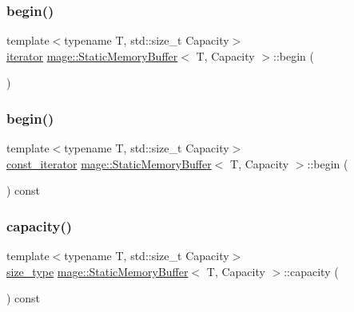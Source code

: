 \subsubsection{\texorpdfstring{begin()}{begin()}\hspace{0.1cm}{\footnotesize\ttfamily [1/2]}}
{\footnotesize\ttfamily template$<$typename T, std\+::size\+\_\+t Capacity$>$ \\
\mbox{\hyperlink{classmage_1_1_static_memory_buffer_abeee1c933cd54117e1a92de4a1cc698f}{iterator}} \mbox{\hyperlink{classmage_1_1_static_memory_buffer}{mage\+::\+Static\+Memory\+Buffer}}$<$ T, Capacity $>$\+::begin (\begin{DoxyParamCaption}{ }\end{DoxyParamCaption})\hspace{0.3cm}{\ttfamily [noexcept]}}

\mbox{\label{classmage_1_1_static_memory_buffer_a616c34676040288167689ee0c9660cb1}} 
\subsubsection{\texorpdfstring{begin()}{begin()}\hspace{0.1cm}{\footnotesize\ttfamily [2/2]}}
{\footnotesize\ttfamily template$<$typename T, std\+::size\+\_\+t Capacity$>$ \\
\mbox{\hyperlink{classmage_1_1_static_memory_buffer_aa871d2967d2e9f4219ab47c16563e328}{const\+\_\+iterator}} \mbox{\hyperlink{classmage_1_1_static_memory_buffer}{mage\+::\+Static\+Memory\+Buffer}}$<$ T, Capacity $>$\+::begin (\begin{DoxyParamCaption}{ }\end{DoxyParamCaption}) const\hspace{0.3cm}{\ttfamily [noexcept]}}

\mbox{\label{classmage_1_1_static_memory_buffer_ab24faf477d7c1613894b73e0aa87eda7}} 
\subsubsection{\texorpdfstring{capacity()}{capacity()}}
{\footnotesize\ttfamily template$<$typename T, std\+::size\+\_\+t Capacity$>$ \\
\mbox{\hyperlink{classmage_1_1_static_memory_buffer_a13e19b7af61a49400c5be360f09aadc8}{size\+\_\+type}} \mbox{\hyperlink{classmage_1_1_static_memory_buffer}{mage\+::\+Static\+Memory\+Buffer}}$<$ T, Capacity $>$\+::capacity (\begin{DoxyParamCaption}{ }\end{DoxyParamCaption}) const\hspace{0.3cm}{\ttfamily [noexcept]}}

